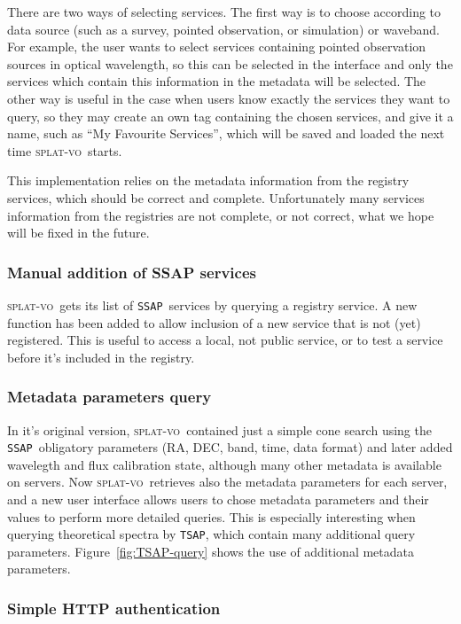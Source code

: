 \documentclass[final,authoryear,5p,times,twocolumn]{elsarticle}
\newcommand{\ssap}{\texttt{SSAP}}
\newcommand{\tsap}{\texttt{TSAP}}
\newcommand{\splatvo}{\textsc{splat-vo}}
\begin{document}
There are two ways of selecting services. The first way is to choose
according to data source (such as a survey, pointed observation, or simulation)
or waveband.  For example, the user wants to select services
containing pointed observation sources in optical wavelength, so this
can be selected in the interface and only the services which contain
this information in the metadata will be selected.  The other way is
useful in the case when users know exactly the services they want to
query, so they may create an own tag containing the chosen services,
and give it a name, such as ``My Favourite Services'', which will be saved
and loaded the next time \splatvo\ starts.

This implementation relies on the metadata information from the
registry services, which should be correct and complete. Unfortunately
many services information from the registries are not complete, or not
correct, what we hope will be fixed in the future.



\subsubsection{Manual addition of SSAP services}

\splatvo\ gets its list of \ssap\ services by querying a registry
service.  A new function has been added to allow inclusion of a new
service that is not (yet) registered. This is useful to access a
local, not public service, or to test a service before it's included
in the registry.

\subsubsection{Metadata parameters query}

In it's original version, \splatvo\ contained just a simple cone search using
the \ssap\ obligatory parameters (RA, DEC, band, time, data format) and later
added wavelegth and flux calibration state, although many other metadata is
available on servers.  Now \splatvo\ retrieves also the metadata parameters for
each server, and a new user interface allows users to chose metadata
parameters and their values to perform more detailed queries.  This is
especially interesting when querying theoretical spectra by \tsap, which contain many
additional query parameters. Figure~\ref{fig:TSAP-query} shows the
use of additional metadata parameters.

\subsubsection{Simple HTTP authentication}
\end{document}
